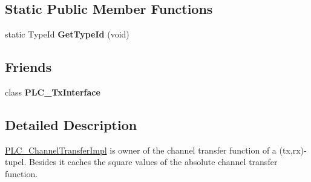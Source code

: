 \subsection*{\-Static \-Public \-Member \-Functions}
\begin{DoxyCompactItemize}
\item 
\hypertarget{classns3_1_1PLC__ChannelTransferImpl_ae64a9ee719cfe0da3574f6c9244e082b}{static \-Type\-Id {\bfseries \-Get\-Type\-Id} (void)}\label{classns3_1_1PLC__ChannelTransferImpl_ae64a9ee719cfe0da3574f6c9244e082b}

\end{DoxyCompactItemize}
\subsection*{\-Friends}
\begin{DoxyCompactItemize}
\item 
\hypertarget{classns3_1_1PLC__ChannelTransferImpl_aa66746b40db26e1809096549f957b7ac}{class {\bfseries \-P\-L\-C\-\_\-\-Tx\-Interface}}\label{classns3_1_1PLC__ChannelTransferImpl_aa66746b40db26e1809096549f957b7ac}

\end{DoxyCompactItemize}


\subsection{\-Detailed \-Description}
\hyperlink{classns3_1_1PLC__ChannelTransferImpl}{\-P\-L\-C\-\_\-\-Channel\-Transfer\-Impl} is owner of the channel transfer function of a (tx,rx)-\/tupel. \-Besides it caches the square values of the absolute channel transfer function. 

